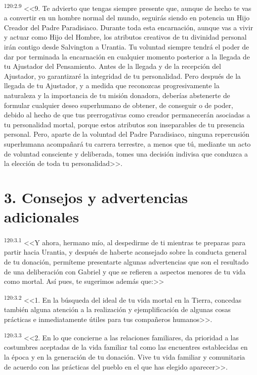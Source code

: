 \par 
\textsuperscript{120:2.9} <<9. Te advierto que tengas siempre presente que, aunque de hecho te vas a convertir en un hombre normal del mundo, seguirás siendo en potencia un Hijo Creador del Padre Paradisiaco. Durante toda esta encarnación, aunque vas a vivir y actuar como Hijo del Hombre, los atributos creativos de tu divinidad personal irán contigo desde Salvington a Urantia. Tu voluntad siempre tendrá el poder de dar por terminada la encarnación en cualquier momento posterior a la llegada de tu Ajustador del Pensamiento. Antes de la llegada y de la recepción del Ajustador, yo garantizaré la integridad de tu personalidad. Pero después de la llegada de tu Ajustador, y a medida que reconozcas progresivamente la naturaleza y la importancia de tu misión donadora, deberías abstenerte de formular cualquier deseo superhumano de obtener, de conseguir o de poder, debido al hecho de que tus prerrogativas como creador permanecerán asociadas a tu personalidad mortal, porque estos atributos son inseparables de tu presencia personal. Pero, aparte de la voluntad del Padre Paradisiaco, ninguna repercusión superhumana acompañará tu carrera terrestre, a menos que tú, mediante un acto de voluntad consciente y deliberada, tomes una decisión indivisa que conduzca a la elección de toda tu personalidad>>.

\section*{3. Consejos y advertencias adicionales}
\par 
\textsuperscript{120:3.1} <<Y ahora, hermano mío, al despedirme de ti mientras te preparas para partir hacia Urantia, y después de haberte aconsejado sobre la conducta general de tu donación, permíteme presentarte algunas advertencias que son el resultado de una deliberación con Gabriel y que se refieren a aspectos menores de tu vida como mortal. Así pues, te sugerimos además que:>>

\par 
\textsuperscript{120:3.2} <<1. En la búsqueda del ideal de tu vida mortal en la Tierra, concedas también alguna atención a la realización y ejemplificación de algunas cosas prácticas e inmediatamente útiles para tus compañeros humanos>>.

\par 
\textsuperscript{120:3.3} <<2. En lo que concierne a las relaciones familiares, da prioridad a las costumbres aceptadas de la vida familiar tal como las encuentres establecidas en la época y en la generación de tu donación. Vive tu vida familiar y comunitaria de acuerdo con las prácticas del pueblo en el que has elegido aparecer>>.


